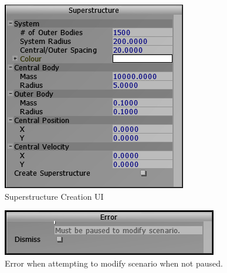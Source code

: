 {\begin{figure}[ht]
  \centering
  \includegraphics[scale=0.7]{../img/superstructureUI.png} 
  \caption{Superstructure Creation UI}
\end{figure}

\begin{figure}[h]
  \centering
  \includegraphics[scale=0.6]{../img/error.png} 
  \caption{Error when attempting to modify scenario when not paused.}
\end{figure}
}

\clearpage